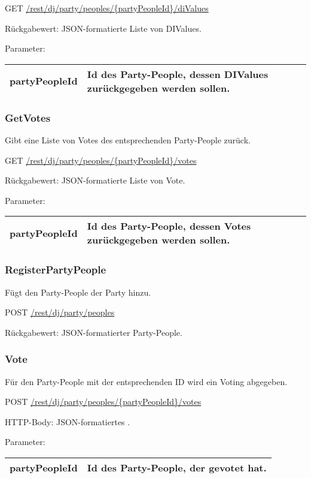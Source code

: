 GET
\url{/rest/dj/party/peoples/{partyPeopleId}/diValues}

Rückgabewert: JSON-formatierte Liste von DIValues.

Parameter:\\
\begin{tabularx}{\textwidth}{|l|X|}
\hline partyPeopleId & Id des Party-People, dessen DIValues zurückgegeben werden sollen. \\ 
\hline 
\end{tabularx}

\subsubsection{GetVotes}
\label{service:GetVotes}
Gibt eine Liste von Votes des entsprechenden Party-People zurück.

GET
\url{/rest/dj/party/peoples/{partyPeopleId}/votes}

Rückgabewert: JSON-formatierte Liste von Vote.

Parameter:\\
\begin{tabularx}{\textwidth}{|l|X|}
\hline partyPeopleId & Id des Party-People, dessen Votes zurückgegeben werden sollen. \\ 
\hline 
\end{tabularx}

\subsubsection{RegisterPartyPeople}
\label{service:RegisterPartyPeople}
Fügt den Party-People der Party hinzu.

POST
\url{/rest/dj/party/peoples}

Rückgabewert: JSON-formatierter Party-People.

\subsubsection{Vote}
\label{service:Vote}
Für den Party-People mit der entsprechenden ID wird ein Voting abgegeben.

POST
\url{/rest/dj/party/peoples/{partyPeopleId}/votes}

HTTP-Body: JSON-formatiertes .

Parameter:\\
\begin{tabularx}{\textwidth}{|l|X|}
\hline partyPeopleId & Id des Party-People, der gevotet hat. \\ 
\hline 
\end{tabularx}

